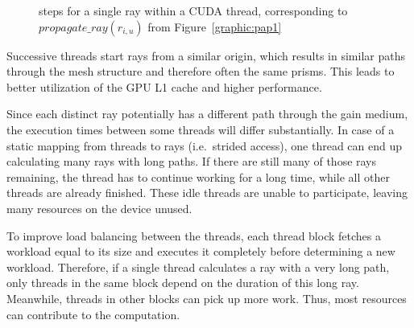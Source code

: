 \begin{figure}[H]
  \centerline
  {}
  \caption{steps for a single ray within a CUDA thread, corresponding to
  $propagate\_ray(r_{i,u})$ from Figure~\ref{graphic:pap1}}
  \label{graphic:algorithm_steps}
\end{figure}
Successive threads start rays from a similar origin, which results
in similar paths through the mesh structure and therefore often the same prisms. This
leads to better utilization of the GPU L1 cache and higher performance.

Since each distinct ray potentially has a different path through the gain
medium, the execution times between some threads will differ substantially. In case
of a static mapping from threads to rays (i.e.\ strided access), one thread can
end up calculating many rays with long paths. If there are still many of those
rays remaining, the thread has to continue working for a long time, while all
other threads are already finished. These idle threads are unable to
participate, leaving many resources on the device unused.

To improve load balancing between the threads, each thread block fetches a
workload equal to its size and executes it completely before determining a new
workload. Therefore, if a single thread calculates a ray with a very long path,
only threads in the same block depend on the duration of this long ray.
Meanwhile, threads in other blocks can pick up more work. Thus, most resources
can contribute to the computation.
    
